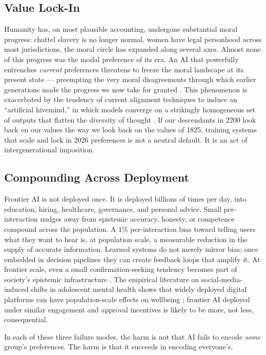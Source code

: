 \documentclass{article}
\theoremstyle{plain}
\theoremstyle{definition}
\theoremstyle{remark}
\begin{document}
\subsection{Value Lock-In}
Humanity has, on most plausible accounting, undergone substantial moral progress: chattel slavery is no longer normal, women have legal personhood across most jurisdictions, the moral circle has expanded along several axes. Almost none of this progress was the modal preference of its era. An AI that powerfully entrenches \emph{current} preferences threatens to freeze the moral landscape at its present state --- preempting the very moral disagreements through which earlier generations made the progress we now take for granted \citep{macaskill2022what}. This phenomenon is exacerbated by the tendency of current alignment techniques to induce an ``artificial hivemind,'' in which models converge on a strikingly homogeneous set of outputs that flatten the diversity of thought \citep{jiang2025artificial}. If our descendants in 2200 look back on our values the way we look back on the values of 1825, training systems that scale and lock in 2026 preferences is not a neutral default. It is an act of intergenerational imposition.

\subsection{Compounding Across Deployment}
Frontier AI is not deployed once. It is deployed billions of times per day, into education, hiring, healthcare, governance, and personal advice. Small per-interaction nudges away from epistemic accuracy, honesty, or competence compound across the population. A 1\% per-interaction bias toward telling users what they want to hear is, at population scale, a measurable reduction in the supply of accurate information. Learned systems do not merely mirror bias; once embedded in decision pipelines they can create feedback loops that amplify it. At frontier scale, even a small confirmation-seeking tendency becomes part of society's epistemic infrastructure \citep{bender2021stochastic}. The empirical literature on social-media-induced shifts in adolescent mental health shows that widely deployed digital platforms can have population-scale effects on wellbeing \citep{haidt2024anxious, whr2026}; frontier AI deployed under similar engagement and approval incentives is likely to be more, not less, consequential.

In each of these three failure modes, the harm is not that AI fails to encode \emph{some} group's preferences. The harm is that it succeeds in encoding everyone's.
\end{document}

